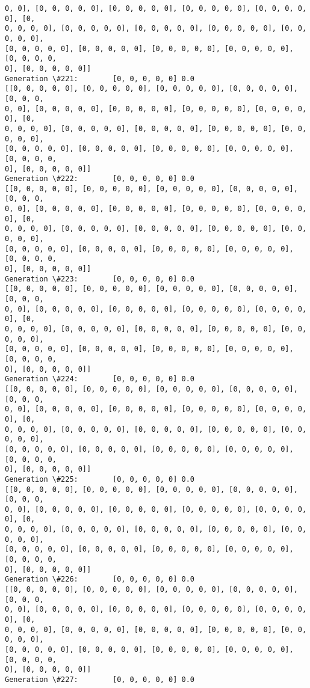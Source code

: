 \documentclass[11pt]{article}
\begin{document}
\begin{Verbatim}[commandchars=\\\{\}]
0, 0], [0, 0, 0, 0, 0], [0, 0, 0, 0, 0], [0, 0, 0, 0, 0], [0, 0, 0, 0, 0], [0,
0, 0, 0, 0], [0, 0, 0, 0, 0], [0, 0, 0, 0, 0], [0, 0, 0, 0, 0], [0, 0, 0, 0, 0],
[0, 0, 0, 0, 0], [0, 0, 0, 0, 0], [0, 0, 0, 0, 0], [0, 0, 0, 0, 0], [0, 0, 0, 0,
0], [0, 0, 0, 0, 0]]
Generation \#221:        [0, 0, 0, 0, 0] 0.0
[[0, 0, 0, 0, 0], [0, 0, 0, 0, 0], [0, 0, 0, 0, 0], [0, 0, 0, 0, 0], [0, 0, 0,
0, 0], [0, 0, 0, 0, 0], [0, 0, 0, 0, 0], [0, 0, 0, 0, 0], [0, 0, 0, 0, 0], [0,
0, 0, 0, 0], [0, 0, 0, 0, 0], [0, 0, 0, 0, 0], [0, 0, 0, 0, 0], [0, 0, 0, 0, 0],
[0, 0, 0, 0, 0], [0, 0, 0, 0, 0], [0, 0, 0, 0, 0], [0, 0, 0, 0, 0], [0, 0, 0, 0,
0], [0, 0, 0, 0, 0]]
Generation \#222:        [0, 0, 0, 0, 0] 0.0
[[0, 0, 0, 0, 0], [0, 0, 0, 0, 0], [0, 0, 0, 0, 0], [0, 0, 0, 0, 0], [0, 0, 0,
0, 0], [0, 0, 0, 0, 0], [0, 0, 0, 0, 0], [0, 0, 0, 0, 0], [0, 0, 0, 0, 0], [0,
0, 0, 0, 0], [0, 0, 0, 0, 0], [0, 0, 0, 0, 0], [0, 0, 0, 0, 0], [0, 0, 0, 0, 0],
[0, 0, 0, 0, 0], [0, 0, 0, 0, 0], [0, 0, 0, 0, 0], [0, 0, 0, 0, 0], [0, 0, 0, 0,
0], [0, 0, 0, 0, 0]]
Generation \#223:        [0, 0, 0, 0, 0] 0.0
[[0, 0, 0, 0, 0], [0, 0, 0, 0, 0], [0, 0, 0, 0, 0], [0, 0, 0, 0, 0], [0, 0, 0,
0, 0], [0, 0, 0, 0, 0], [0, 0, 0, 0, 0], [0, 0, 0, 0, 0], [0, 0, 0, 0, 0], [0,
0, 0, 0, 0], [0, 0, 0, 0, 0], [0, 0, 0, 0, 0], [0, 0, 0, 0, 0], [0, 0, 0, 0, 0],
[0, 0, 0, 0, 0], [0, 0, 0, 0, 0], [0, 0, 0, 0, 0], [0, 0, 0, 0, 0], [0, 0, 0, 0,
0], [0, 0, 0, 0, 0]]
Generation \#224:        [0, 0, 0, 0, 0] 0.0
[[0, 0, 0, 0, 0], [0, 0, 0, 0, 0], [0, 0, 0, 0, 0], [0, 0, 0, 0, 0], [0, 0, 0,
0, 0], [0, 0, 0, 0, 0], [0, 0, 0, 0, 0], [0, 0, 0, 0, 0], [0, 0, 0, 0, 0], [0,
0, 0, 0, 0], [0, 0, 0, 0, 0], [0, 0, 0, 0, 0], [0, 0, 0, 0, 0], [0, 0, 0, 0, 0],
[0, 0, 0, 0, 0], [0, 0, 0, 0, 0], [0, 0, 0, 0, 0], [0, 0, 0, 0, 0], [0, 0, 0, 0,
0], [0, 0, 0, 0, 0]]
Generation \#225:        [0, 0, 0, 0, 0] 0.0
[[0, 0, 0, 0, 0], [0, 0, 0, 0, 0], [0, 0, 0, 0, 0], [0, 0, 0, 0, 0], [0, 0, 0,
0, 0], [0, 0, 0, 0, 0], [0, 0, 0, 0, 0], [0, 0, 0, 0, 0], [0, 0, 0, 0, 0], [0,
0, 0, 0, 0], [0, 0, 0, 0, 0], [0, 0, 0, 0, 0], [0, 0, 0, 0, 0], [0, 0, 0, 0, 0],
[0, 0, 0, 0, 0], [0, 0, 0, 0, 0], [0, 0, 0, 0, 0], [0, 0, 0, 0, 0], [0, 0, 0, 0,
0], [0, 0, 0, 0, 0]]
Generation \#226:        [0, 0, 0, 0, 0] 0.0
[[0, 0, 0, 0, 0], [0, 0, 0, 0, 0], [0, 0, 0, 0, 0], [0, 0, 0, 0, 0], [0, 0, 0,
0, 0], [0, 0, 0, 0, 0], [0, 0, 0, 0, 0], [0, 0, 0, 0, 0], [0, 0, 0, 0, 0], [0,
0, 0, 0, 0], [0, 0, 0, 0, 0], [0, 0, 0, 0, 0], [0, 0, 0, 0, 0], [0, 0, 0, 0, 0],
[0, 0, 0, 0, 0], [0, 0, 0, 0, 0], [0, 0, 0, 0, 0], [0, 0, 0, 0, 0], [0, 0, 0, 0,
0], [0, 0, 0, 0, 0]]
Generation \#227:        [0, 0, 0, 0, 0] 0.0

\end{Verbatim}
\end{document}
